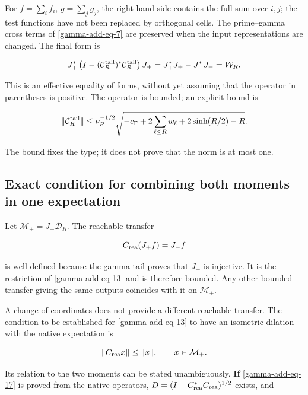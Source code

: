 For \(f=\sum_i f_i\), \(g=\sum_j g_j\), the right-hand side contains the full sum over \(i,j\); the test functions have not been replaced by orthogonal cells. The prime--gamma cross terms of \eqref{gamma-add-eq-7} are preserved when the input representations are changed. The final form is

\begin{equation}
J_+^*\left(I-(\mathcal C_R^{\rm tail})^*\mathcal C_R^{\rm tail}\right)J_+
=J_+^*J_+-J_-^*J_-=\mathcal W_R.
\label{gamma-add-eq-16}
\end{equation}

This is an effective equality of forms, without yet assuming that the operator in parentheses is positive. The operator is bounded; an explicit bound is

\begin{equation}
\|\mathcal C_R^{\rm tail}\|
\le\nu_R^{-1/2}
\sqrt{-c_\Gamma+2\sum_{\ell\le R}w_\ell+2\sinh(R/2)-R}.
\label{gamma-add-display-33}
\end{equation}

The bound fixes the type; it does not prove that the norm is at most one.

\subsection{Exact condition for combining both moments in one expectation}
\label{gamma-add-sub-375}

Let \(\mathcal M_+=\overline{J_+\mathcal D_R}\). The reachable transfer

\begin{equation}
C_{\rm rea}(J_+f)=J_-f
\label{gamma-add-display-34}
\end{equation}

is well defined because the gamma tail proves that \(J_+\) is injective. It is the restriction of \eqref{gamma-add-eq-13} and is therefore bounded. Any other bounded transfer giving the same outputs coincides with it on \(\mathcal M_+\).

A change of coordinates does not provide a different reachable transfer. The condition to be established for \eqref{gamma-add-eq-13} to have an isometric dilation with the native expectation is

\begin{equation}
\|C_{\rm rea}x\|\le\|x\|,
\qquad x\in\mathcal M_+.
\label{gamma-add-eq-17}
\end{equation}

Its relation to the two moments can be stated unambiguously. \textbf{If} \eqref{gamma-add-eq-17} is proved from the native operators, \(D=(I-C_{\rm rea}^*C_{\rm rea})^{1/2}\) exists, and

